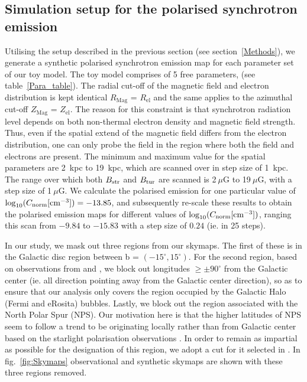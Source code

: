 \documentclass[12pt, a4 paper]{mnras}
\begin{document}
\subsection{Simulation setup for the polarised synchrotron emission}
Utilising the setup described in the previous section (see section~\ref{Methods}), we generate a synthetic polarised synchrotron emission map for each parameter set of our toy model. The toy model comprises of 5 free parameters, (see table~\ref{Para_table}). The radial cut-off of the magnetic field and electron distribution is kept identical $R_{\mathrm{Mag}}$ = $R_{\mathrm{el}}$ and the same applies to the azimuthal cut-off $Z_{\mathrm{Mag}}$ = $Z_{\mathrm{el}}$. The reason for this constraint is that synchrotron radiation level depends on both non-thermal electron density and magnetic field strength. Thus, even if the spatial extend of the magnetic field differs from the electron distribution, one can only probe the field in the region where both the field and electrons are present. The minimum and maximum value for the spatial parameters are 2~kpc to 19~kpc, which are scanned over in step size of 1~kpc. The range over which both $B_{\rm str}$ and $B_{\rm tur}$ are scanned is 2$~\mu$G to 19$~\mu$G, with a step size of 1$~\mu$G. We calculate the polarised emission for one particular value of $\log_{10}(C_{\rm norm}[{\rm cm}^{-3}]) = -13.85$, and subsequently re-scale these results to obtain the polarised emission maps for different values of  $\log_{10}(C_{\rm norm} [{\rm cm}^{-3}])$, ranging this scan from $-9.84$ to $-15.83$ with a step size of $0.24$ (ie. in 25 steps).

In our study, we mask out three regions from our skymaps. The first of these is in the Galactic disc region between b = $(-15^{\circ},15^{\circ})$. For the second region, based on observations from \cite{eROSITA} and \cite{Su_2010}, we block out longitudes  $\geq \pm 90^{\circ}$ from the Galactic center (ie. all direction pointing away from the Galactic center direction), so as to ensure that our analysis only covers the region occupied by the Galactic Halo (Fermi and eRosita) bubbles. Lastly, we block out the region associated with the North Polar Spur (NPS). Our motivation here is that the higher latitudes of NPS seem to follow a trend to be originating locally rather than from Galactic center based on the starlight polarisation observations \cite{Gina_2021}. In order to remain as impartial as possible for the designation of this region, we adopt a cut for it selected in \cite{Wolleben_2007}. In fig.~\ref{fig:Skymaps} observational and synthetic skymaps are shown with these three regions removed.
\end{document}
